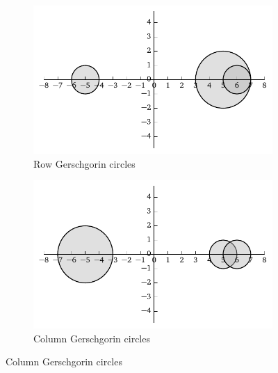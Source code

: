 \begin{figure}
 \begin{subfigure}{\textwidth}
  \centering
  \includegraphics{figs/passive/gerschgorin-row.pdf}
  \caption{Row Gerschgorin circles}
 \end{subfigure}
 
 \begin{subfigure}{\textwidth}
  \centering
  \includegraphics{figs/passive/gerschgorin-col.pdf}
  \caption{Column Gerschgorin circles}
 \end{subfigure}
 

\end{figure}
